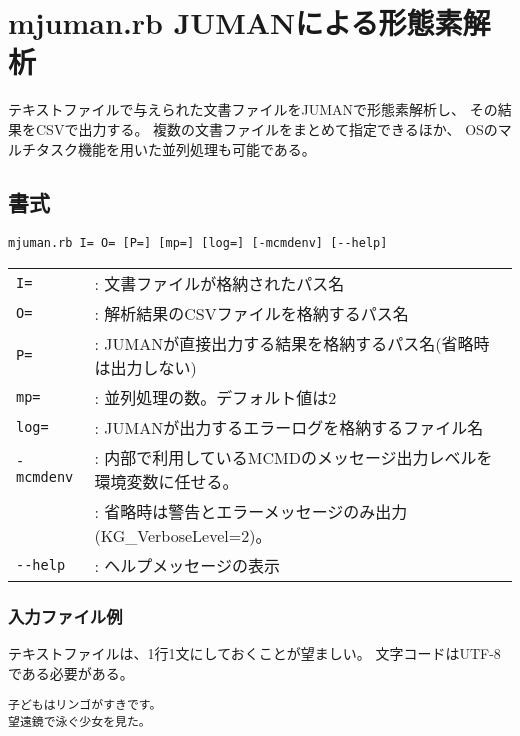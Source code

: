 



\section{mjuman.rb JUMANによる形態素解析\label{sect:mjuman}}

テキストファイルで与えられた文書ファイルをJUMANで形態素解析し、
その結果をCSVで出力する。
複数の文書ファイルをまとめて指定できるほか、
OSのマルチタスク機能を用いた並列処理も可能である。

\subsection{書式}
\begin{verbatim}
mjuman.rb I= O= [P=] [mp=] [log=] [-mcmdenv] [--help]
\end{verbatim}

\begin{table}[htbp]
{\small
\begin{tabular}{ll}
\verb|I=|       & : 文書ファイルが格納されたパス名 \\
\verb|O=|       & : 解析結果のCSVファイルを格納するパス名 \\
\verb|P=|       & : JUMANが直接出力する結果を格納するパス名(省略時は出力しない) \\
\verb|mp=|      & : 並列処理の数。デフォルト値は2 \\
\verb|log=|     & : JUMANが出力するエラーログを格納するファイル名 \\
\verb|-mcmdenv| & : 内部で利用しているMCMDのメッセージ出力レベルを環境変数に任せる。 \\
                & : 省略時は警告とエラーメッセージのみ出力(KG\_VerboseLevel=2)。 \\
\verb|--help|   & : ヘルプメッセージの表示 \\
\end{tabular} 
}
\end{table} 

\subsubsection*{入力ファイル例}

テキストファイルは、1行1文にしておくことが望ましい。
文字コードはUTF-8である必要がある。

\begin{Verbatim}[baselinestretch=0.7,frame=single]
子どもはリンゴがすきです。
望遠鏡で泳ぐ少女を見た。
\end{Verbatim}


